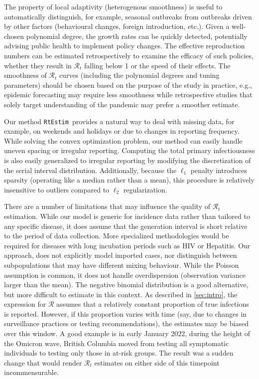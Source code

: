 \documentclass[10pt,letterpaper]{article}
\def\RtEstim{\texttt{RtEstim}}
\def\calR{\mathcal{R}}
\begin{document}
The property of local adaptivity (heterogenous smoothness) is useful to
automatically distinguish, for example, seasonal outbreaks from outbreaks driven
by other factors (behavioural changes, foreign introduction, etc.). Given a
well-chosen polynomial degree, the growth rates can be quickly detected, 
potentially advising public health to implement policy changes. The effective
reproduction numbers can be estimated retrospectively to examine the efficacy of
such policies, whether they result in $\calR_t$ falling below 1 or the speed of
their effects. The smoothness of $\calR_t$ curves (including the polynomial 
degrees and tuning parameters) should be chosen based on the purpose of the 
study in practice, e.g., epidemic forecasting may require less smoothness
while retrospective studies that 
solely target understanding of the pandemic may prefer a smoother estimate. 


Our method \RtEstim\ provides a natural way to deal with missing data, for
example, on weekends and holidays or due to changes in reporting frequency.
While solving the convex optimization problem, our method can easily 
handle uneven spacing or irregular reporting. Computing the total
primary infectiousness is also easily generalized to irregular reporting by
modifying the discretization of the serial interval distribution. Additionally,
because the $\ell_1$ penalty introduces sparsity (operating like a median
rather than a mean), this procedure is relatively insensitive to outliers
compared to $\ell_2$ regularization.


There are a number of limitations that may influence the quality of
$\calR_t$ estimation. While our model is generic for incidence data 
rather than tailored to any specific disease, it does assume that the 
generation interval is short relative to the period of data collection. 
More specialized methodologies would be required for diseases with long 
incubation periods such as HIV or Hepatitis. 
Our approach, does not explicitly model imported cases, nor distinguish between
subpopulations that may have different mixing behaviour. 
While the Poisson assumption is common, it does not handle overdispersion
(observation variance larger than the mean). The negative binomial distribution
is a good alternative, but more difficult to estimate in this context.
As described in \autoref{sec:intro}, the expression for $\calR$ 
assumes that a relatively constant proportion of true infections is reported. 
However, if this proportion varies with time (say, due to changes in surveillance
practices or testing recommendations), the estimates may be biased over this
window. A good example is in early January 2022, during the height of the
Omicron wave, British Columbia moved from testing all symptomatic individuals to
testing only those in at-risk groups. The result was a sudden change that would
render $\calR_t$ estimates on either side of this timepoint incommensurable.
\end{document}

